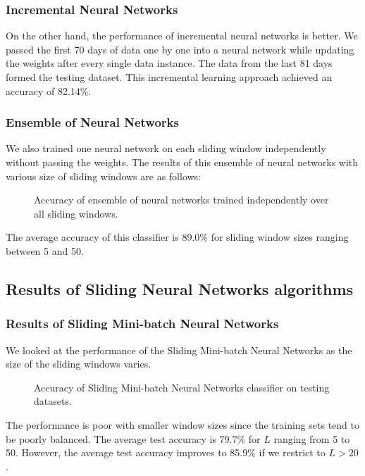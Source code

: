 \documentclass[conference]{IEEEtran}
\begin{document}
		\subsubsection{Incremental Neural Networks}
		On the other hand, the performance of incremental neural networks is better. We passed the first 70 days of data one by one into a neural network while updating the weights after every single data instance. The data from the last 81 days formed the testing dataset. This incremental learning approach achieved an accuracy of 82.14\%.
		
		\subsubsection{Ensemble of Neural Networks} We also trained one neural network on each sliding window independently without passing the weights. The results of this ensemble of neural networks with various size of sliding windows are as follows:
		\begin{figure}[H]
			\centering
			\caption{Accuracy of ensemble of neural networks trained independently over all sliding windows.}
			\label{fig:accuracy-smnn}
		\end{figure}
		The average accuracy of this classifier is 89.0\% for sliding window sizes ranging between 5 and 50.
		
		\subsection{Results of Sliding Neural Networks algorithms}
		
		\subsubsection{Results of Sliding Mini-batch Neural Networks}
		We looked at the performance of the Sliding Mini-batch Neural Networks as the size of the sliding windows varies.
		\begin{figure}[H]
			\centering
			\caption{Accuracy of Sliding Mini-batch Neural Networks classifier on testing datasets.}
			\label{fig:accuracy-smnn}
		\end{figure}
		
		The performance is poor with smaller window sizes since the training sets tend to be poorly balanced. The average test accuracy is 79.7\% for $L$ ranging from 5 to 50. However, the average test accuracy improves to 85.9\% if we restrict to $L > 20$.
		
\end{document}
